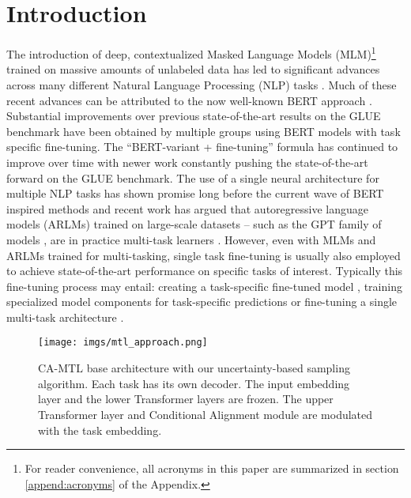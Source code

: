 \documentclass{article} \usepackage{iclr2021_conference,times}
\begin{document}
\section{Introduction}
The introduction of deep, contextualized Masked Language Models (MLM)\footnote{For reader convenience, all acronyms in this paper are summarized in section \ref{append:acronyms} of the Appendix.} trained on massive amounts of unlabeled data has led to significant advances across many different Natural Language Processing (NLP) tasks \citep{word_context,trans_context}. Much of these recent advances can be attributed to the now well-known BERT approach \citep{bert}. Substantial improvements over previous state-of-the-art results on the GLUE benchmark
\citep{wang-etal-2018-glue} have been obtained by multiple groups using BERT models with task specific fine-tuning. The ``BERT-variant + fine-tuning'' formula has continued to improve over time with newer work constantly pushing the state-of-the-art forward on the GLUE benchmark. The use of a single neural architecture for multiple NLP tasks has shown promise long before the current wave of BERT inspired methods \citep{DBLP:conf/icml/CollobertW08} and recent work has argued that autoregressive language models (ARLMs) trained on large-scale datasets -- such as the GPT family of models \citep{Radford2018ImprovingLU}, are in practice multi-task learners \citep{brown2020language}. However, even with MLMs and ARLMs trained for multi-tasking, single task fine-tuning is usually also employed to achieve state-of-the-art performance on specific tasks of interest. 
Typically this fine-tuning process may entail: creating a task-specific fine-tuned model \citep{bert}, training specialized model components for task-specific predictions \citep{DBLP:journals/corr/abs-1902-00751} or fine-tuning a single multi-task architecture \citep{mtl_bert_liu2019}.

\begin{wrapfigure}[17]{r}{0.47\textwidth}
    \begin{center}
      \vspace{-23pt}
      \texttt{[image: imgs/mtl\_approach.png]}
    \end{center}
    \caption{\label{fig:model} \small $\text{CA-MTL}$ base architecture with our uncertainty-based sampling algorithm. Each task has its own decoder. The input embedding layer and the lower Transformer layers are frozen. The upper Transformer layer and Conditional Alignment module are modulated with the task embedding.}
\end{wrapfigure}
\end{document}
